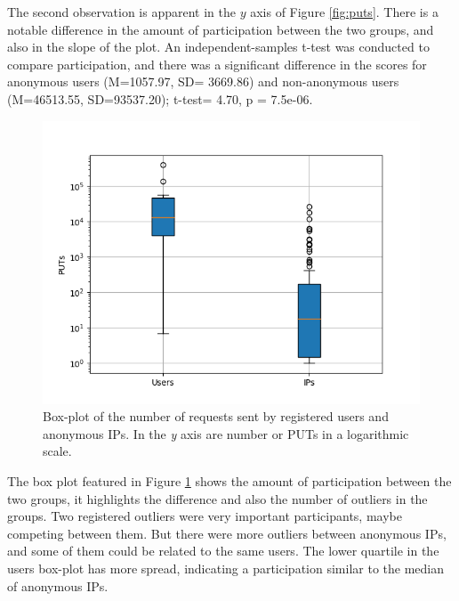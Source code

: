 \documentclass{llncs}
\begin{document}
The second observation is apparent in the $y$ axis of Figure
\ref{fig:puts}. There is a notable difference in the amount of
participation between the two groups, and also in the slope of the
plot.  An independent-samples t-test was conducted to compare participation, and there was a significant difference in the scores for anonymous users  (M=1057.97, SD= 3669.86) and non-anonymous users (M=46513.55, SD=93537.20); t-test= 4.70, p = 7.5e-06. 


           
%

\begin{figure}[htb]
    \centering
        \includegraphics[width=5in]{img/puts_box.png}
    \caption{ Box-plot of the number of requests sent by registered users and anonymous IPs.
     In the \emph{y} axis are number or PUTs in a logarithmic scale.
    }
    \label{fig:box}
\end{figure}
%
The box plot featured in Figure \ref{fig:box} shows the amount of participation between the two groups, it highlights
the difference and also the number of outliers in the groups. Two registered
outliers were very important participants, maybe competing between them. But
there were more outliers between anonymous IPs, and some of them could be related to the same users. The lower quartile in the users box-plot has more
spread, indicating a participation similar to the median of anonymous IPs.
\end{document}
